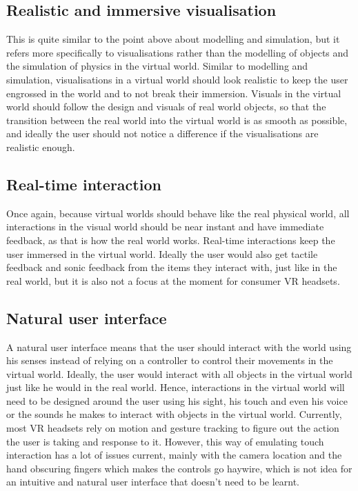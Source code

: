 \documentclass[11pt]{article}
\begin{document}
\subsection{Realistic and immersive visualisation}
\label{sec:org34f541e}
This is quite similar to the point above about modelling and simulation, but it refers more specifically to visualisations rather than the modelling of objects and the simulation of physics in the virtual world. Similar to modelling and simulation, visualisations in a virtual world should look realistic to keep the user engrossed in the world and to not break their immersion. Visuals in the virtual world should follow the design and visuals of real world objects, so that the transition between the real world into the virtual world is as smooth as possible, and ideally the user should not notice a difference if the visualisations are realistic enough.
\subsection{Real-time interaction}
\label{sec:org301f6ca}
Once again, because virtual worlds should behave like the real physical world, all interactions in the visual world should be near instant and have immediate feedback, as that is how the real world works. Real-time interactions keep the user immersed in the virtual world. Ideally the user would also get tactile feedback and sonic feedback from the items they interact with, just like in the real world, but it is also not a focus at the moment for consumer VR headsets.
\subsection{Natural user interface}
\label{sec:org3baa325}
A natural user interface means that the user should interact with the world using his senses instead of relying on a controller to control their movements in the virtual world. Ideally, the user would interact with all objects in the virtual world just like he would in the real world. Hence, interactions in the virtual world will need to be designed around the user using his sight, his touch and even his voice or the sounds he makes to interact with objects in the virtual world. Currently, most VR headsets rely on motion and gesture tracking to figure out the action the user is taking and response to it. However, this way of emulating touch interaction has a lot of issues current, mainly with the camera location and the hand obscuring fingers which makes the controls go haywire, which is not idea for an intuitive and natural user interface that doesn't need to be learnt.
\end{document}
